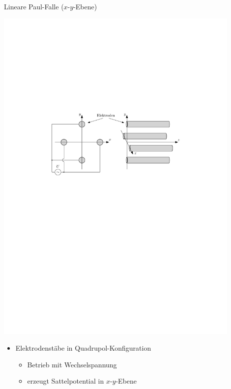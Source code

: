 \documentclass[12pt,xcolor=dvipsnames,professionalfonts]{beamer}
\begin{document}
\begin{frame}{Lineare Paul-Falle ($x$-$y$-Ebene)}
	\begin{center}
		\includegraphics[width=0.9\textwidth]{./figures/lineare_paulfalle_ohne_endkappen.pdf}
	\end{center}
	\vspace{-0.3cm}
	\begin{itemize}
		\setlength\itemsep{1em}
		\item Elektrodenstäbe in Quadrupol-Konfiguration
		\begin{itemize}
			\item Betrieb mit Wechselspannung
			\item erzeugt Sattelpotential in $x$-$y$-Ebene
		\end{itemize}
		
		\end{itemize}
\end{frame}
\end{document}
